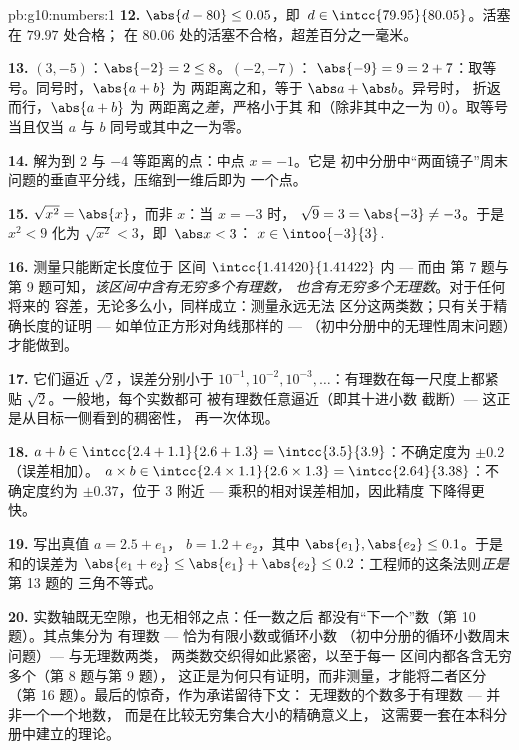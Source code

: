 \begin{solution}{pb:g10:numbers:1}
\textbf{12.} $\abs{d - 80} \leq 0.05$，即\
$d \in \intcc{79.95}{80.05}$。活塞在 $79.97$ 处合格；
在 $80.06$ 处的活塞不合格，超差百分之一毫米。

\textbf{13.} $(3, -5)$：$\abs{-2} = 2 \leq 8$。$(-2, -7)$：
$\abs{-9} = 9 = 2 + 7$：取等号。同号时，$\abs{a + b}$ 为
两距离之和，等于 $\abs a + \abs b$。异号时，
折返而行，$\abs{a + b}$ 为
两距离之\emph{差}，严格小于其
和（除非其中之一为 $0$）。取等号当且仅当 $a$ 与
$b$ 同号或其中之一为零。

\textbf{14.} 解为到 $2$
与 $-4$ 等距离的点：中点 $x = -1$。它是
初中分册中“两面镜子”周末问题的垂直平分线，压缩到一维后即为
一个点。

\textbf{15.} $\sqrt{x^2} = \abs{x}$，而非 $x$：当 $x = -3$ 时，
$\sqrt{9} = 3 = \abs{-3} \neq -3$。于是 $x^2 < 9$ 化为
$\sqrt{x^2} < 3$，即\ $\abs x < 3$：
$x \in \intoo{-3}{3}$.

\textbf{16.} 测量只能断定长度位于
区间 $\intcc{1.41420}{1.41422}$ 内 --- 而由
第 7 题与第 9 题可知，\emph{该区间中含有无穷多个有理数，
也含有无穷多个无理数}。对于任何将来的
容差，无论多么小，同样成立：测量永远无法
区分这两类数；只有关于精确长度的证明
--- 如单位正方形对角线那样的 ---
（初中分册中的无理性周末问题）才能做到。

\textbf{17.} 它们逼近 $\sqrt2$，误差分别小于
$10^{-1}, 10^{-2}, 10^{-3}, \dots$：有理数在每一尺度上都紧贴
$\sqrt2$。一般地，每个实数都可
被有理数任意逼近（即其十进小数
截断）--- 这正是从目标一侧看到的稠密性，
再一次体现。

\textbf{18.} $a + b \in \intcc{2.4 + 1.1}{2.6 + 1.3} =
\intcc{3.5}{3.9}$：不确定度为 $\pm 0.2$（误差相加）。
$a \times b \in \intcc{2.4 \times 1.1}{2.6 \times 1.3} =
\intcc{2.64}{3.38}$：不确定度约为 $\pm 0.37$，位于
$3$ 附近 --- 乘积的相对误差相加，因此精度
下降得更快。

\textbf{19.} 写出真值 $a = 2.5 + e_1$，
$b = 1.2 + e_2$，其中 $\abs{e_1}, \abs{e_2} \leq 0.1$。于是
和的误差为 $\abs{e_1 + e_2} \leq \abs{e_1} +
\abs{e_2} \leq 0.2$：工程师的这条法则\emph{正是}第 13 题的
三角不等式。

\textbf{20.} 实数轴既无空隙，也无相邻之点：任一数之后
都没有“下一个”数（第 10 题）。其点集分为
有理数 --- 恰为有限小数或循环小数
（初中分册的循环小数周末问题）--- 与无理数两类，
两类数交织得如此紧密，以至于每一
区间内都各含无穷多个（第 8 题与第 9 题），
这正是为何只有证明，而非测量，才能将二者区分
（第 16 题）。最后的惊奇，作为承诺留待下文：
无理数的个数多于有理数 --- 并非一个一个地数，
而是在比较无穷集合大小的精确意义上，
这需要一套在本科分册中建立的理论。
\end{solution}
